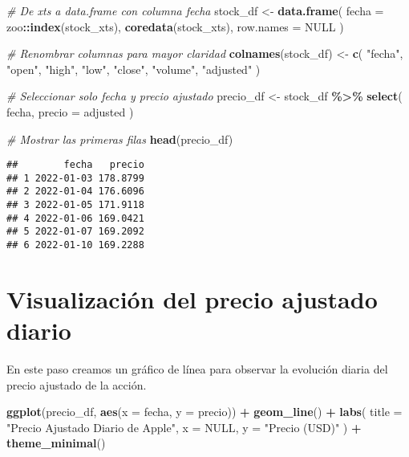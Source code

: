 \documentclass[
  11pt,
]{book}
\newenvironment{Shaded}{\begin{snugshade}}{\end{snugshade}}
\newcommand{\AttributeTok}[1]{\textcolor[rgb]{0.13,0.29,0.53}{#1}}
\newcommand{\CommentTok}[1]{\textcolor[rgb]{0.56,0.35,0.01}{\textit{#1}}}
\newcommand{\ConstantTok}[1]{\textcolor[rgb]{0.56,0.35,0.01}{#1}}
\newcommand{\FunctionTok}[1]{\textcolor[rgb]{0.13,0.29,0.53}{\textbf{#1}}}
\newcommand{\NormalTok}[1]{#1}
\newcommand{\OtherTok}[1]{\textcolor[rgb]{0.56,0.35,0.01}{#1}}
\newcommand{\SpecialCharTok}[1]{\textcolor[rgb]{0.81,0.36,0.00}{\textbf{#1}}}
\newcommand{\StringTok}[1]{\textcolor[rgb]{0.31,0.60,0.02}{#1}}
\begin{document}
\begin{Shaded}
\begin{Highlighting}[]
\CommentTok{\# De xts a data.frame con columna \textquotesingle{}fecha\textquotesingle{}}
\NormalTok{stock\_df }\OtherTok{\textless{}{-}} \FunctionTok{data.frame}\NormalTok{(}
  \AttributeTok{fecha =}\NormalTok{ zoo}\SpecialCharTok{::}\FunctionTok{index}\NormalTok{(stock\_xts),}
  \FunctionTok{coredata}\NormalTok{(stock\_xts),}
  \AttributeTok{row.names =} \ConstantTok{NULL}
\NormalTok{)}

\CommentTok{\# Renombrar columnas para mayor claridad}
\FunctionTok{colnames}\NormalTok{(stock\_df) }\OtherTok{\textless{}{-}} \FunctionTok{c}\NormalTok{(}
  \StringTok{"fecha"}\NormalTok{,}
  \StringTok{"open"}\NormalTok{, }\StringTok{"high"}\NormalTok{, }\StringTok{"low"}\NormalTok{, }\StringTok{"close"}\NormalTok{, }\StringTok{"volume"}\NormalTok{, }\StringTok{"adjusted"}
\NormalTok{)}

\CommentTok{\# Seleccionar solo fecha y precio ajustado}
\NormalTok{precio\_df }\OtherTok{\textless{}{-}}\NormalTok{ stock\_df }\SpecialCharTok{\%\textgreater{}\%}
  \FunctionTok{select}\NormalTok{(}
\NormalTok{    fecha,}
    \AttributeTok{precio =}\NormalTok{ adjusted}
\NormalTok{  )}

\CommentTok{\# Mostrar las primeras filas}
\FunctionTok{head}\NormalTok{(precio\_df)}
\end{Highlighting}
\end{Shaded}

\begin{verbatim}
##        fecha   precio
## 1 2022-01-03 178.8799
## 2 2022-01-04 176.6096
## 3 2022-01-05 171.9118
## 4 2022-01-06 169.0421
## 5 2022-01-07 169.2092
## 6 2022-01-10 169.2288
\end{verbatim}

\section{Visualización del precio ajustado diario}\label{visualizaciuxf3n-del-precio-ajustado-diario}

En este paso creamos un gráfico de línea para observar la evolución diaria del precio ajustado de la acción.

\begin{Shaded}
\begin{Highlighting}[]
\FunctionTok{ggplot}\NormalTok{(precio\_df, }\FunctionTok{aes}\NormalTok{(}\AttributeTok{x =}\NormalTok{ fecha, }\AttributeTok{y =}\NormalTok{ precio)) }\SpecialCharTok{+}
  \FunctionTok{geom\_line}\NormalTok{() }\SpecialCharTok{+}
  \FunctionTok{labs}\NormalTok{(}
    \AttributeTok{title =} \StringTok{"Precio Ajustado Diario de Apple"}\NormalTok{,}
    \AttributeTok{x     =} \ConstantTok{NULL}\NormalTok{,}
    \AttributeTok{y     =} \StringTok{"Precio (USD)"}
\NormalTok{  ) }\SpecialCharTok{+}
  \FunctionTok{theme\_minimal}\NormalTok{()}
\end{Highlighting}
\end{Shaded}
\end{document}
